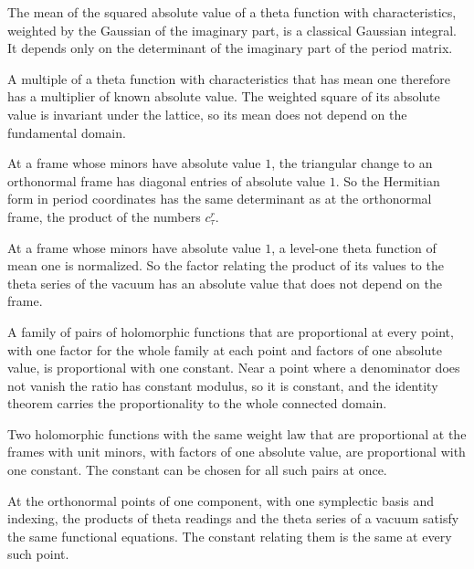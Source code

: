 The mean of the squared absolute value of a theta function with characteristics, weighted by the Gaussian of the
imaginary part, is a classical Gaussian integral. It depends only on the determinant of the imaginary part of the period
matrix.

A multiple of a theta function with characteristics that has mean one therefore has a multiplier of known absolute
value. The weighted square of its absolute value is invariant under the lattice, so its mean does not depend on the
fundamental domain.

At a frame whose minors have absolute value $1$, the triangular change to an orthonormal frame has diagonal entries of
absolute value $1$. So the Hermitian form in period coordinates has the same determinant as at the orthonormal frame,
the product of the numbers $c_\tau^r$.

At a frame whose minors have absolute value $1$, a level-one theta function of mean one is normalized. So the factor
relating the product of its values to the theta series of the vacuum has an absolute value that does not depend on the
frame.

A family of pairs of holomorphic functions that are proportional at every point, with one factor for the whole family
at each point and factors of one absolute value, is proportional with one constant. Near a point where a denominator does
not vanish the ratio has constant modulus, so it is constant, and the identity theorem carries the proportionality to the
whole connected domain.

Two holomorphic functions with the same weight law that are proportional at the frames with unit minors, with factors of
one absolute value, are proportional with one constant. The constant can be chosen for all such pairs at once.

At the orthonormal points of one component, with one symplectic basis and indexing, the products of theta
readings and the theta series of a vacuum satisfy the same functional equations. The constant relating them
is the same at every such point.

